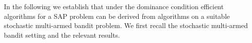 \documentclass{article}
\begin{document}
In the following we establish that under the dominance condition efficient algorithms for a SAP problem can be derived from algorithms on a suitable stochastic multi-armed bandit problem. We first recall the stochastic multi-armed bandit setting and the relevant results. 

\end{document}
